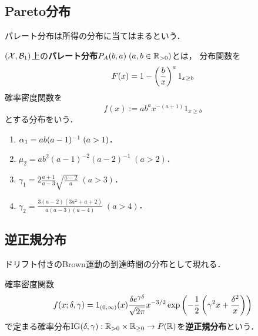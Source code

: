 \documentclass[uplatex,dvipdfmx]{jsreport}
\begin{document}
\subsection{Pareto分布}

\begin{tcolorbox}[colframe=ForestGreen, colback=ForestGreen!10!white,breakable,colbacktitle=ForestGreen!40!white,coltitle=black,fonttitle=\bfseries\sffamily,
title=]
    パレート分布は所得の分布に当てはまるという．
\end{tcolorbox}

\begin{definition}
    $(\mathcal{X},\mathcal{B}_1)$上の\textbf{パレート分布}$P_A(b,a)\;(a,b\in\mathbb{R}_{>0})$とは，
    分布関数を
    \[F(x)=1-\left(\frac{b}{x}\right)^a1_{x\ge b}\]
    確率密度関数を
    \[f(x):=ab^ax^{-(a+1)}1_{x\ge b}\]
    とする分布をいう．
\end{definition}

\begin{proposition}\mbox{}
    \begin{enumerate}
        \item $\alpha_1=ab(a-1)^{-1}\;(a>1)$．
        \item $\mu_2=ab^2(a-1)^{-2}(a-2)^{-1}\;(a>2)$．
        \item $\gamma_1=2\frac{a+1}{a-3}\sqrt{\frac{a-2}{a}}\;(a>3)$．
        \item $\gamma_2=\frac{3(a-2)(3a^2+a+2)}{a(a-3)(a-4)}\;(a>4)$．
    \end{enumerate}
\end{proposition}

\subsection{逆正規分布}

\begin{tcolorbox}[colframe=ForestGreen, colback=ForestGreen!10!white,breakable,colbacktitle=ForestGreen!40!white,coltitle=black,fonttitle=\bfseries\sffamily,
title=]
    ドリフト付きのBrown運動の到達時間の分布として現れる．
\end{tcolorbox}

\begin{definition}
    確率密度関数
    \[f(x;\delta,\gamma)=1_{(0,\infty)}(x)\frac{\delta e^{\gamma\delta}}{\sqrt{2\pi}}x^{-3/2}\exp\left(-\frac{1}{2}\left(\gamma^2x+\frac{\delta^2}{x}\right)\right)\]
    で定まる確率分布$\mathrm{IG}(\delta,\gamma):\mathbb{R}_{>0}\times\mathbb{R}_{\ge0}\to P(\mathbb{R})$を\textbf{逆正規分布}という．
\end{definition}
\end{document}
